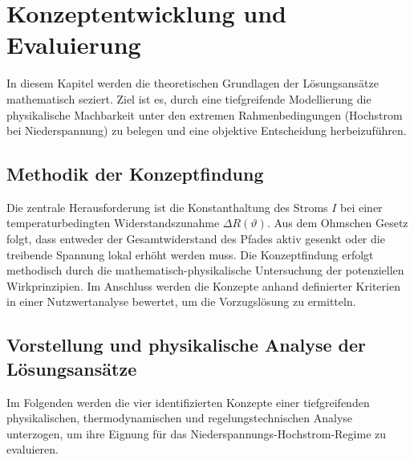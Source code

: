 \section{Konzeptentwicklung und Evaluierung}
\label{chap:konzeptentwicklung}

In diesem Kapitel werden die theoretischen Grundlagen der Lösungsansätze mathematisch seziert. Ziel ist es, durch eine tiefgreifende Modellierung die physikalische Machbarkeit unter den extremen Rahmenbedingungen (Hochstrom bei Niederspannung) zu belegen und eine objektive Entscheidung herbeizuführen.
\subsection{Methodik der Konzeptfindung}
\label{sec:methodik}

Die zentrale Herausforderung ist die Konstanthaltung des Stroms $I$ bei einer temperaturbedingten Widerstandszunahme $\Delta R(\vartheta)$. Aus dem Ohmschen Gesetz folgt, dass entweder der Gesamtwiderstand des Pfades aktiv gesenkt oder die treibende Spannung lokal erhöht werden muss.
Die Konzeptfindung erfolgt methodisch durch die mathematisch-physikalische Untersuchung der potenziellen Wirkprinzipien. Im Anschluss werden die Konzepte anhand definierter Kriterien in einer Nutzwertanalyse bewertet, um die Vorzugslösung zu ermitteln.
\subsection{Vorstellung und physikalische Analyse der Lösungsansätze}
\label{sec:vorstellung_loesungsansaetze}

Im Folgenden werden die vier identifizierten Konzepte einer tiefgreifenden physikalischen, thermodynamischen und regelungstechnischen Analyse unterzogen, um ihre Eignung für das Niederspannungs-Hochstrom-Regime zu evaluieren.

